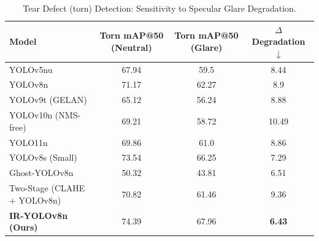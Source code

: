\begin{table}[tb]
\centering
\caption{Tear Defect (torn) Detection: Sensitivity to Specular Glare Degradation.}
\label{tab:defect_breakdown}
\scriptsize
\begin{tabular}{lccc}
\toprule
\textbf{Model} & \textbf{Torn mAP@50 (Neutral)} & \textbf{Torn mAP@50 (Glare)} & \textbf{$\Delta$ Degradation $\downarrow$} \\
\midrule
YOLOv5nu & 67.94 & 59.5 & 8.44 \\
YOLOv8n & 71.17 & 62.27 & 8.9 \\
YOLOv9t (GELAN) & 65.12 & 56.24 & 8.88 \\
YOLOv10n (NMS-free) & 69.21 & 58.72 & 10.49 \\
YOLO11n & 69.86 & 61.0 & 8.86 \\
YOLOv8s (Small) & 73.54 & 66.25 & 7.29 \\
Ghost-YOLOv8n & 50.32 & 43.81 & 6.51 \\
Two-Stage (CLAHE + YOLOv8n) & 70.82 & 61.46 & 9.36 \\
\textbf{IR-YOLOv8n (Ours)} & 74.39 & 67.96 & \textbf{6.43} \\
\bottomrule
\end{tabular}
\end{table}
